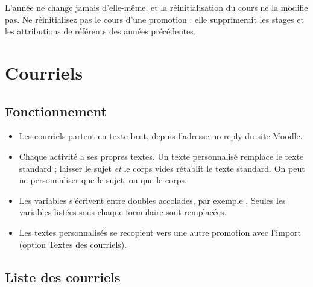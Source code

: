 \documentclass[11pt,a4paper]{article}
\begin{document}

\begin{attention}
L'année ne change jamais d'elle-même, et la réinitialisation du cours ne la
modifie pas. Ne réinitialisez pas le cours d'une promotion : elle supprimerait les
stages et les attributions de référents des années précédentes.
\end{attention}

\section{Courriels}
\label{sec:courriels}

\subsection{Fonctionnement}

\begin{itemize}
  \item Les courriels partent en texte brut, depuis l'adresse \og no-reply\fg{}
        du site Moodle.
  \item Chaque activité a ses propres textes. Un texte personnalisé remplace le
        texte standard ; laisser le sujet \emph{et} le corps vides rétablit le
        texte standard. On peut ne personnaliser que le sujet, ou que le corps.
  \item Les variables s'écrivent entre doubles accolades, par exemple
        . Seules les variables listées sous chaque formulaire sont
        remplacées.
  \item Les textes personnalisés se recopient vers une autre promotion avec
        l'import (option \og Textes des courriels\fg{}).
\end{itemize}


\subsection{Liste des courriels}
\label{sec:liste-courriels}
\end{document}
